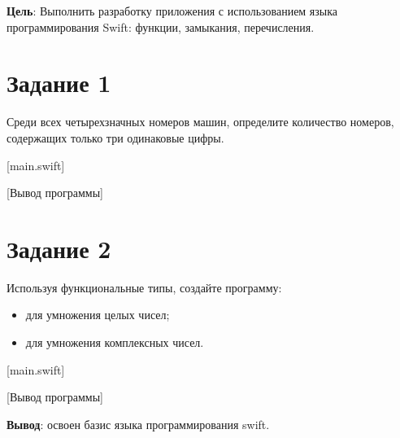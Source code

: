 \documentclass{bsuir}
\begin{document}
\maketitle
\mainmatter
\renewcommand{\thefigure}{\arabic{figure}}
\renewcommand{\thelisting}{\arabic{listing}}

\textbf{Цель}: Выполнить разработку приложения с использованием языка
программирования Swift: функции, замыкания, перечисления.

\section*{Задание 1}

Среди всех четырехзначных номеров машин, определите количество номеров,
содержащих только три одинаковые цифры.

[main.swift]

[Вывод программы]

\section*{Задание 2}

Используя функциональные типы, создайте программу:

\begin{itemize}
    \item для умножения целых чисел;
    \item для умножения комплексных чисел.
\end{itemize}

[main.swift]

[Вывод программы]

\textbf{Вывод}: освоен базис языка программирования swift.
\end{document}
